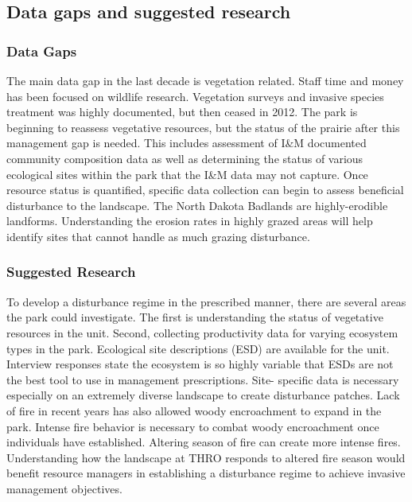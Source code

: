 \subsection{Data gaps and suggested research}

\subsubsection{Data Gaps}

The main data gap in the last decade is vegetation related. 
Staff time and money has been focused on wildlife research. 
Vegetation surveys and invasive species treatment was highly documented, but then ceased in 2012. 
The park is beginning to reassess vegetative resources, but the status of the prairie after this management gap is needed. 
This includes assessment of I\&M documented community composition data as well as determining the status of various ecological sites within the park that the I\&M data may not capture. 
Once resource status is quantified, specific data collection can begin to assess beneficial disturbance to the landscape. 
The North Dakota Badlands are highly-erodible landforms. 
Understanding the erosion rates in highly grazed areas will help identify sites that cannot handle as much grazing disturbance.

\subsubsection{Suggested Research}

To develop a disturbance regime in the prescribed manner, there are several areas the park could investigate. 
The first is understanding the status of vegetative resources in the unit. 
Second, collecting productivity data for varying ecosystem types in the park. 
Ecological site descriptions (ESD) are available for the unit. 
Interview responses state the ecosystem is so highly variable that ESDs are not the best tool to use in management prescriptions. 
Site- specific data is necessary especially on an extremely diverse landscape to create disturbance patches. 
Lack of fire in recent years has also allowed woody encroachment to expand in the park. 
Intense fire behavior is necessary to combat woody encroachment once individuals have established. 
Altering season of fire can create more intense fires. 
Understanding how the landscape at THRO responds to altered fire season would benefit resource managers in establishing a disturbance regime to achieve invasive management objectives.

